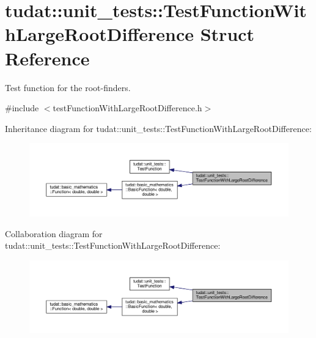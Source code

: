 \hypertarget{structtudat_1_1unit__tests_1_1TestFunctionWithLargeRootDifference}{}\section{tudat\+:\+:unit\+\_\+tests\+:\+:Test\+Function\+With\+Large\+Root\+Difference Struct Reference}
\label{structtudat_1_1unit__tests_1_1TestFunctionWithLargeRootDifference}


Test function for the root-\/finders.  




{\ttfamily \#include $<$test\+Function\+With\+Large\+Root\+Difference.\+h$>$}



Inheritance diagram for tudat\+:\+:unit\+\_\+tests\+:\+:Test\+Function\+With\+Large\+Root\+Difference\+:
\nopagebreak
\begin{figure}[H]
\begin{center}
\leavevmode
\includegraphics[width=350pt]{structtudat_1_1unit__tests_1_1TestFunctionWithLargeRootDifference__inherit__graph}
\end{center}
\end{figure}


Collaboration diagram for tudat\+:\+:unit\+\_\+tests\+:\+:Test\+Function\+With\+Large\+Root\+Difference\+:
\nopagebreak
\begin{figure}[H]
\begin{center}
\leavevmode
\includegraphics[width=350pt]{structtudat_1_1unit__tests_1_1TestFunctionWithLargeRootDifference__coll__graph}
\end{center}
\end{figure}
